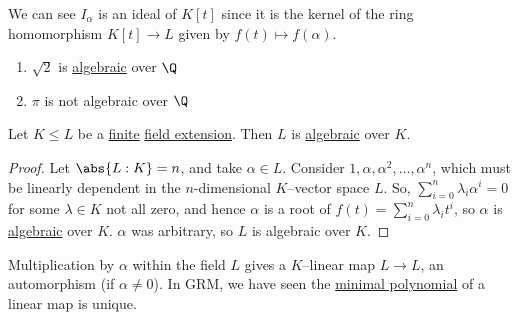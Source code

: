 \documentclass{article}
\begin{document}
\begin{remark}
    We can see $I_\alpha$ is an ideal of $K[t]$ since it is the kernel of the ring homomorphism $K[t] \to L$ given by $f(t) \mapsto f(\alpha)$.
\end{remark}

\begin{eg}
    \leavevmode
    \begin{enumerate}[label=(\roman*)]
        \item $\sqrt{2}$ is \hyperlink{def:algebraic}{algebraic} over $\Q$
        \item $\pi$ is not algebraic over $\Q$
    \end{enumerate}
\end{eg}

\begin{nlemma}\label{lem:1.5}
    Let $K \leq L$ be a \hyperlink{def:degreeOfFieldExt}{finite} \hyperlink{def:fieldExt}{field extension}. Then $L$ is \hyperlink{def:algebraic}{algebraic} over $K$.
\end{nlemma}

\begin{proof}
    Let $\abs{L:K}=n$, and take $\alpha \in L$. Consider $1, \alpha, \alpha^2, \dotsc, \alpha^n$, which must be linearly dependent in the $n$-dimensional $K$--vector space $L$.
    So, $\sum_{i=0}^n \lambda_i \alpha^i = 0$ for some $\lambda \in K$ not all zero, and hence $\alpha$ is a root of $f(t) = \sum_{i=0}^n \lambda_i t^i$, so $\alpha$ is \hyperlink{def:algebraic}{algebraic} over $K$.
    $\alpha$ was arbitrary, so $L$ is algebraic over $K$.
\end{proof}


\begin{remark}
    Multiplication by $\alpha$ within the field $L$ gives a $K$--linear map $L \to L$, an automorphism (if $\alpha \ne 0$).  In GRM, we have seen the \hyperlink{def:minimalPoly}{minimal polynomial} of a linear map is unique.
\end{remark}
\end{document}
